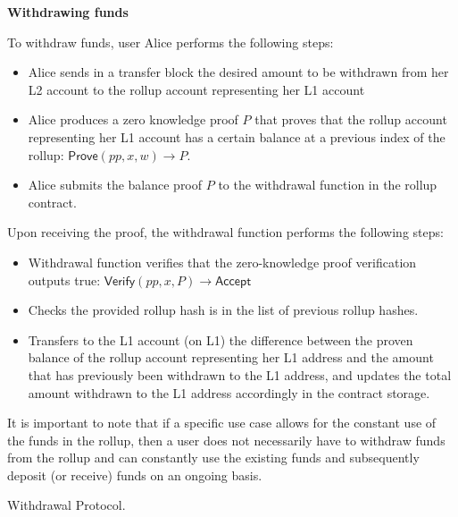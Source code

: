 \begin{Protocol*}[h!]
\begin{mdframed}

\fontsize{10pt}{2cm}

\textbf{Withdrawing funds} 
\smallbreak

To withdraw funds, user Alice performs the following steps:


\begin{itemize}
    \setlength\itemsep{0.15em}

    \item Alice sends in a transfer block the desired amount to be withdrawn from her L2 account to the rollup account representing her L1 account

    \item Alice produces a zero knowledge proof $P$ that proves that the rollup account representing her L1 account has a certain balance at a previous index of the rollup: $\mathsf{Prove}(pp, x, w) \rightarrow P$.

    \item Alice submits the balance proof \(P\) to the withdrawal function in the rollup contract.
\end{itemize}

Upon receiving the proof, the withdrawal function performs the following steps:

\begin{itemize}
    \setlength\itemsep{0.15em}

    \item Withdrawal function verifies that the zero-knowledge proof verification outputs true: $\mathsf{Verify}(pp, x, P) \rightarrow \mathsf{Accept}$

    \item Checks the provided rollup hash is in the list of previous rollup hashes.

    \item Transfers to the L1 account (on L1) the difference between the proven balance of the rollup account representing her L1 address and the amount that has previously been withdrawn to the L1 address, and updates the total amount withdrawn to the L1 address accordingly in the contract storage.
\end{itemize}

It is important to note that if a specific use case allows for the constant use of the funds in the rollup, then a user does not necessarily have to withdraw funds from the rollup and can constantly use the existing funds and subsequently deposit (or receive) funds on an ongoing basis. 

\normalsize	
\end{mdframed}
\caption{Withdrawal Protocol.\label{box:withdrawal}}
\end{Protocol*}